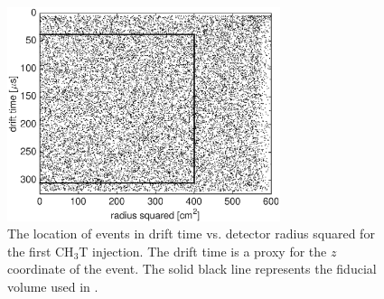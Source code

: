 \begin{figure}[h!]\centering
\includegraphics[width=80mm]{fig/rz_scatter.eps}
\caption{The location of events in drift time vs. detector radius squared for the first CH$_3$T injection. The drift time is a proxy for the $z$ coordinate of the event. The solid black line represents the fiducial volume used in \cite{lux-prl}.}
\label{fig:event_location}
\end{figure}





